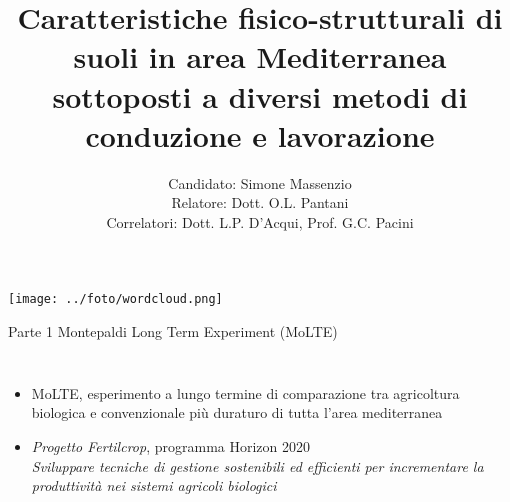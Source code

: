 \documentclass[xcolor={usenames, table, x11names}, final, 10pt]{beamer}
\title[25 anni di conduzione biologica in area Mediterranea: uno
studio di fisica del suolo] %
{ Caratteristiche fisico-strutturali di suoli in area Mediterranea
  sottoposti a diversi metodi di conduzione e lavorazione}
\author[Simone Massenzio]{ 
  Candidato: Simone Massenzio \\
  Relatore: Dott. O.L. Pantani\\
  \vspace{0.1cm}
  Correlatori:
  Dott. L.P. D'Acqui, Prof. G.C. Pacini}
\institute[] { \emph{Dipartimento di Scienze della Produzioni Animali e
    dell'Ambiente\\
    Universit\`a degli Studi di Firenze - UniFI\\}
  
}
\date{\displaydate{date}}
\begin{document}
{\1
  \begin{frame}[noframenumbering]%
    \titlepage
  \end{frame}}




\begin{frame}
  \vspace{2cm}
  
  \centering
  \texttt{[image: ../foto/wordcloud.png]}
  
\end{frame}

\begin{frame}{Parte 1 \small{Montepaldi Long Term Experiment (MoLTE)}}
  \begin{columns}
    
    \begin{itemize}[<+->]
      \item MoLTE, esperimento a lungo termine di comparazione tra
        agricoltura biologica e convenzionale più duraturo di tutta
        l'area mediterranea
      \item \emph{Progetto Fertilcrop}, programma Horizon
        2020\\
     \emph{Sviluppare tecniche di gestione sostenibili ed efficienti per
    incrementare la produttività nei sistemi agricoli biologici}
    \end{itemize}

  \end{columns}
\end{frame}
\end{document}
